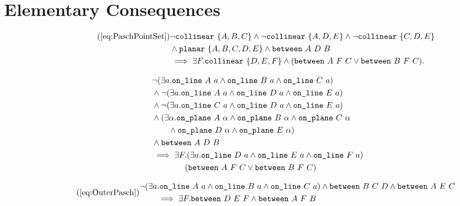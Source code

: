 \section{Elementary Consequences}
\begin{align}
  \tag{\ref{eq:PaschPointSet}}
  &\neg\code{collinear}\ \{A,B,C\}\wedge\neg\code{collinear}\ \{A,D,E\}\wedge\neg\code{collinear}\ \{C,D,E\}\\
  &\wedge\code{planar}\ \{A,B,C,D,E\}\wedge\between{A}{D}{B}\\
  &\implies\exists F. \code{collinear}\ \{D,E,F\} \wedge (\between{A}{F}{C}\vee\between{B}{F}{C}).
\end{align} 

\begin{equation}\label{eq:PaschPointSetUnfold}
  \begin{split}
    &\neg(\exists a.\texttt{on\_line}\ A\ a\wedge \texttt{on\_line}\ B\ a\wedge \texttt{on\_line}\ C\ a)\\
    &\wedge\neg(\exists a.\texttt{on\_line}\ A\ a\wedge \texttt{on\_line}\ D\ a\wedge \texttt{on\_line}\ E\ a)\\
    &\wedge\neg(\exists a.\texttt{on\_line}\ C\ a\wedge \texttt{on\_line}\ D\ a\wedge \texttt{on\_line}\ E\ a)\\
    &\wedge(\exists\alpha. \texttt{on\_plane}\ A\ \alpha\wedge \texttt{on\_plane}\ B\ \alpha\wedge \texttt{on\_plane}\ C\ \alpha\\
    &\qquad\wedge \texttt{on\_plane}\ D\ \alpha\wedge \texttt{on\_plane}\ E\ \alpha)\\
    &\wedge\texttt{between}\ A\ D\ B\\
    &\implies\exists F. (\exists a. \texttt{on\_line}\ D\ a\wedge \texttt{on\_line}\ E\ a\wedge \texttt{on\_line}\ F\ a)\\
    &\qquad\qquad (\texttt{between}\ A\ F\ C\vee\texttt{between}\ B\ F\ C)
  \end{split}
\end{equation}

\begin{equation}
  \tag{\ref{eq:OuterPasch}}
  \begin{split}
    &\Triangle{a}{A}{B}{C} \wedge \between{B}{C}{D} \wedge \between{A}{E}{C}\\ 
    &\qquad\implies \exists F. \between{D}{E}{F} \wedge \between{A}{F}{B}
  \end{split}
\end{equation}


